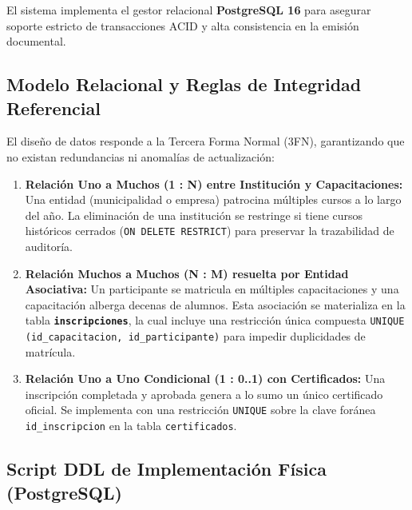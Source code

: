 \documentclass[11pt,a4paper]{article}
\begin{document}
El sistema implementa el gestor relacional \textbf{PostgreSQL 16} para asegurar soporte estricto de transacciones ACID y alta consistencia en la emisión documental.

\subsection{Modelo Relacional y Reglas de Integridad Referencial}
El diseño de datos responde a la Tercera Forma Normal (3FN), garantizando que no existan redundancias ni anomalías de actualización:
\begin{enumerate}\setlength\itemsep{0.2em}
    \item \textbf{Relación Uno a Muchos (1 : N) entre Institución y Capacitaciones:} Una entidad (municipalidad o empresa) patrocina múltiples cursos a lo largo del año. La eliminación de una institución se restringe si tiene cursos históricos cerrados (\texttt{ON DELETE RESTRICT}) para preservar la trazabilidad de auditoría.
    \item \textbf{Relación Muchos a Muchos (N : M) resuelta por Entidad Asociativa:} Un participante se matricula en múltiples capacitaciones y una capacitación alberga decenas de alumnos. Esta asociación se materializa en la tabla \textbf{\texttt{inscripciones}}, la cual incluye una restricción única compuesta \texttt{UNIQUE (id\_capacitacion, id\_participante)} para impedir duplicidades de matrícula.
    \item \textbf{Relación Uno a Uno Condicional (1 : 0..1) con Certificados:} Una inscripción completada y aprobada genera a lo sumo un único certificado oficial. Se implementa con una restricción \texttt{UNIQUE} sobre la clave foránea \texttt{id\_inscripcion} en la tabla \texttt{certificados}.
\end{enumerate}

\subsection{Script DDL de Implementación Física (PostgreSQL)}
\end{document}
